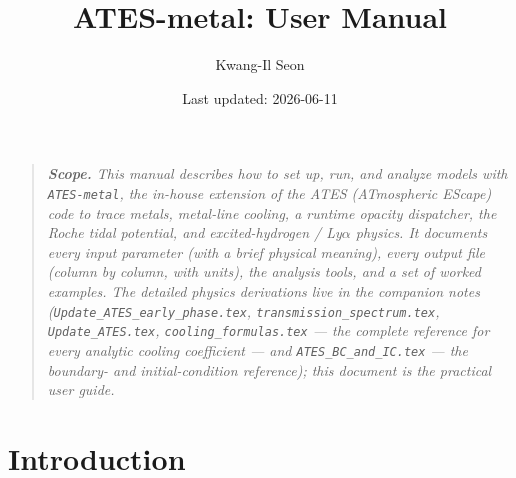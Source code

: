 \documentclass[english,a4paper]{kiseon_memo}
\begin{document}
\title{ATES-metal: User Manual}
\author{Kwang-Il Seon}
\date{Last updated: 2026-06-11}
\maketitle

\begin{quote}\small\itshape
\textbf{Scope.} This manual describes how to set up, run, and analyze models with
\texttt{ATES-metal}, the in-house extension of the ATES (ATmospheric EScape) code
to trace metals, metal-line cooling, a runtime opacity dispatcher, the Roche
tidal potential, and excited-hydrogen / Ly$\alpha$ physics. It documents every
input parameter (with a brief physical meaning), every output file (column by
column, with units), the analysis tools, and a set of worked examples. The
detailed physics derivations live in the companion notes
(\texttt{Update\_ATES\_early\_phase.tex}, \texttt{transmission\_spectrum.tex},
\texttt{Update\_ATES.tex}, \texttt{cooling\_formulas.tex} --- the complete
reference for every analytic cooling coefficient ---
and \texttt{ATES\_BC\_and\_IC.tex} --- the boundary- and
initial-condition reference); this document is the practical user
guide.
\end{quote}

\tableofcontents

\section{Introduction}
\end{document}
